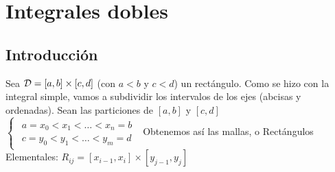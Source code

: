 \documentclass{report}
\begin{document}
\chapter{Integrales dobles}
  \section{Introducción}
    \noindent Sea $\mathcal{D}=\left[a,b\right]\times\left[c,d\right]$ (con $a<b$ y $c<d$)
    un rectángulo. Como se hizo con la integral simple, vamos a subdividir
    los intervalos de los ejes (abcisas y ordenadas). Sean las particiones de
    $\left[a,b\right]$ y $\left[c,d\right]$\\ \setlength\extrarowheight{0pt}
    $\begin{cases}\begin{aligned}a=x_0<x_1<\hdots<x_n=b\\c=y_0<y_1<\hdots<y_m=d\end{aligned}\end{cases}$
    Obtenemos así las mallas, o Rectángulos Elementales:
    $R_{ij}=\left[x_{i-1},x_i\right]\times\left[y_{j-1},y_j\right]$
\end{document}
